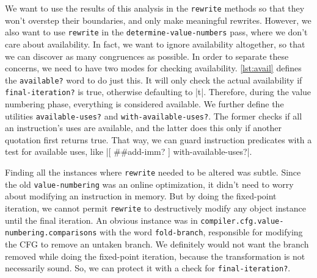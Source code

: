 We want to use the results of this analysis in the \Verb|rewrite| methods so
that they won't overstep their boundaries, and only make meaningful rewrites.
However, we also want to use \Verb|rewrite| in the
\Verb|determine-value-numbers| pass, where we don't care about availability.
In fact, we want to ignore availability altogether, so that we can discover as
many congruences as possible.  In order to separate these concerns, we need to
have two modes for checking availability.  \cref{lst:avail} defines the
\Verb|available?| word to do just this.  It will only check the actual
availability if \Verb|final-iteration?| is true, otherwise defaulting to
\factor|t|.  Therefore, during the value numbering phase, everything is
considered available.  We further define the utilities \Verb|available-uses?|
and \Verb|with-available-uses?|.  The former checks if all an instruction's
uses are available, and the latter does this only if another quotation first
returns true.  That way, we can guard instruction predicates with a test for
available uses, like
%
\factor|[ ##add-imm? ] with-available-uses?|.


Finding all the instances where \Verb|rewrite| needed to be altered was
subtle.  Since the old \Verb|value-numbering| was an online optimization, it
didn't need to worry about modifying an instruction in memory.  But by doing
the fixed-point iteration, we cannot permit \Verb|rewrite| to destructively
modify any object instance until the final iteration.  An obvious instance was
in \Verb|compiler.cfg.value-numbering.comparisons| with the word
\Verb|fold-branch|, responsible for modifying the \gls{CFG} to remove an
untaken branch.  We definitely would not want the branch removed while doing
the fixed-point iteration, because the transformation is not necessarily sound.
So, we can protect it with a check for \Verb|final-iteration?|.


